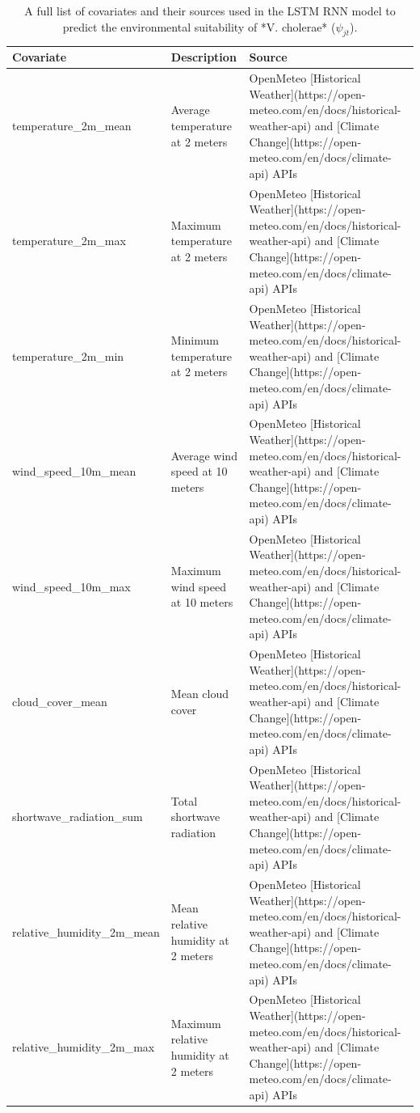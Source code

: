\documentclass[
]{book}
\begin{document}
\begin{table}

\caption{\label{tab:climate-data-variables}A full list of covariates and their sources used in the LSTM RNN model to predict the environmental suitability of *V. cholerae* ($\psi_{jt}$).}
\centering
\begin{tabular}[t]{l|l|l}
\hline
Covariate & Description & Source\\
\hline
temperature\_2m\_mean & Average temperature at 2 meters & OpenMeteo [Historical Weather](https://open-meteo.com/en/docs/historical-weather-api) and [Climate Change](https://open-meteo.com/en/docs/climate-api) APIs\\
\hline
temperature\_2m\_max & Maximum temperature at 2 meters & OpenMeteo [Historical Weather](https://open-meteo.com/en/docs/historical-weather-api) and [Climate Change](https://open-meteo.com/en/docs/climate-api) APIs\\
\hline
temperature\_2m\_min & Minimum temperature at 2 meters & OpenMeteo [Historical Weather](https://open-meteo.com/en/docs/historical-weather-api) and [Climate Change](https://open-meteo.com/en/docs/climate-api) APIs\\
\hline
wind\_speed\_10m\_mean & Average wind speed at 10 meters & OpenMeteo [Historical Weather](https://open-meteo.com/en/docs/historical-weather-api) and [Climate Change](https://open-meteo.com/en/docs/climate-api) APIs\\
\hline
wind\_speed\_10m\_max & Maximum wind speed at 10 meters & OpenMeteo [Historical Weather](https://open-meteo.com/en/docs/historical-weather-api) and [Climate Change](https://open-meteo.com/en/docs/climate-api) APIs\\
\hline
cloud\_cover\_mean & Mean cloud cover & OpenMeteo [Historical Weather](https://open-meteo.com/en/docs/historical-weather-api) and [Climate Change](https://open-meteo.com/en/docs/climate-api) APIs\\
\hline
shortwave\_radiation\_sum & Total shortwave radiation & OpenMeteo [Historical Weather](https://open-meteo.com/en/docs/historical-weather-api) and [Climate Change](https://open-meteo.com/en/docs/climate-api) APIs\\
\hline
relative\_humidity\_2m\_mean & Mean relative humidity at 2 meters & OpenMeteo [Historical Weather](https://open-meteo.com/en/docs/historical-weather-api) and [Climate Change](https://open-meteo.com/en/docs/climate-api) APIs\\
\hline
relative\_humidity\_2m\_max & Maximum relative humidity at 2 meters & OpenMeteo [Historical Weather](https://open-meteo.com/en/docs/historical-weather-api) and [Climate Change](https://open-meteo.com/en/docs/climate-api) APIs\\

\end{tabular}
\end{table}
\end{document}
